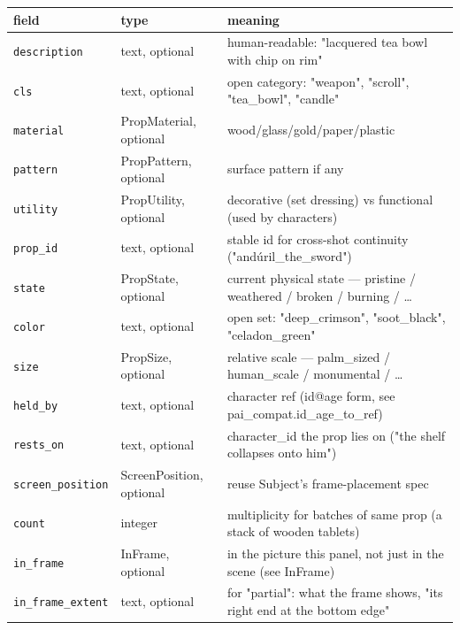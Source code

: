 \begin{longtable}{@{}R{0.24\textwidth}R{0.21\textwidth}R{0.49\textwidth}@{}}
\toprule \textbf{field} & \textbf{type} & \textbf{meaning} \\ \midrule
\endhead
\texttt{description} & text, optional & human-readable: "lacquered tea bowl with chip on rim" \\
\texttt{cls} & text, optional & open category: "weapon", "scroll", "tea\_\allowbreak bowl", "candle" \\
\texttt{material} & PropMaterial, optional & wood/\allowbreak{}glass/\allowbreak{}gold/\allowbreak{}paper/\allowbreak{}plastic \\
\texttt{pattern} & PropPattern, optional & surface pattern if any \\
\texttt{utility} & PropUtility, optional & decorative (set dressing) vs functional (used by characters) \\
\texttt{prop\_\allowbreak id} & text, optional & stable id for cross-shot continuity ("and\'uril\_\allowbreak the\_\allowbreak sword") \\
\texttt{state} & PropState, optional & current physical state ---\allowbreak{} pristine /\allowbreak{} weathered /\allowbreak{} broken /\allowbreak{} burning /\allowbreak{} \ldots{} \\
\texttt{color} & text, optional & open set: "deep\_\allowbreak crimson", "soot\_\allowbreak black", "celadon\_\allowbreak green" \\
\texttt{size} & PropSize, optional & relative scale ---\allowbreak{} palm\_\allowbreak sized /\allowbreak{} human\_\allowbreak scale /\allowbreak{} monumental /\allowbreak{} \ldots{} \\
\texttt{held\_\allowbreak by} & text, optional & character ref (id@age form, see pai\_\allowbreak compat.id\_\allowbreak age\_\allowbreak to\_\allowbreak ref) \\
\texttt{rests\_\allowbreak on} & text, optional & character\_\allowbreak id the prop lies on ("the shelf collapses onto him") \\
\texttt{screen\_\allowbreak position} & ScreenPosition, optional & reuse Subject's frame-placement spec \\
\texttt{count} & integer & multiplicity for batches of same prop (a stack of wooden tablets) \\
\texttt{in\_\allowbreak frame} & InFrame, optional & in the picture this panel, not just in the scene (see InFrame) \\
\texttt{in\_\allowbreak frame\_\allowbreak extent} & text, optional & for "partial": what the frame shows, "its right end at the bottom edge" \\
\bottomrule
\end{longtable}

